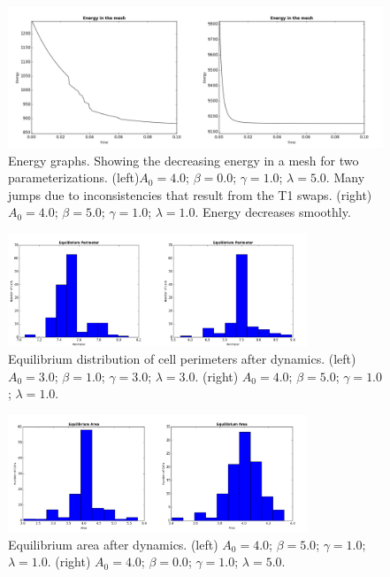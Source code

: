 \begin{figure}
\centering
\includegraphics[width=\textwidth]{../diagrams/energyComp.png}
\caption[Energy graphs.]{Energy graphs. Showing the decreasing energy in a mesh for two parameterizations. (left)$A_0 = 4.0$; $\beta = 0.0$; $\gamma = 1.0$; $\lambda = 5.0$. Many jumps due to inconsistencies that result from the T1 swaps. (right) $A_0 = 4.0$; $\beta = 5.0$; $\gamma = 1.0$; $\lambda = 1.0$. Energy decreases smoothly.}
\label{fig:g1}
\end{figure}

\begin{figure}
\centering
\includegraphics[width=0.8\textwidth]{../diagrams/perimComp.png}
\caption[Equilibrium area graphs]{Equilibrium distribution of cell perimeters after dynamics. (left) $A_0 = 3.0$; $\beta = 1.0$; $\gamma = 3.0$; $\lambda = 3.0$. (right) $A_0 = 4.0$; $\beta = 5.0$; $\gamma = 1.0$; $\lambda = 1.0$.}
\label{fig:g2}
\end{figure}

\begin{figure}
\centering
\includegraphics[width=0.8\textwidth]{../diagrams/areaComp.png}
\caption[Equilibrium area graphs]{Equilibrium area after dynamics. (left) $A_0 = 4.0$; $\beta = 5.0$; $\gamma = 1.0$; $\lambda = 1.0$. (right) $A_0 = 4.0$; $\beta = 0.0$; $\gamma = 1.0$; $\lambda = 5.0$.}
\label{fig:g3}
\end{figure}

